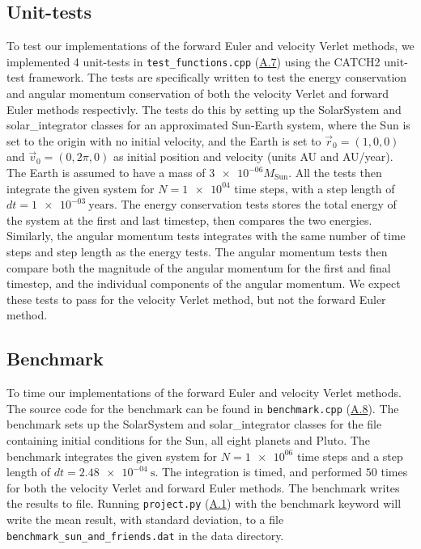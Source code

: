 \documentclass[reprint,english,notitlepage]{revtex4-1}  %
\begin{document}
\subsection{Unit-tests} \label{sec:III:d}
To test our implementations of the forward Euler and velocity Verlet methods, we implemented 4 unit-tests in \verb+test_functions.cpp+ (\hyperref[A.7]{A.7}) using the CATCH2 unit-test framework. The tests are specifically written to test the energy conservation and angular momentum conservation of both the velocity Verlet and forward Euler methods respectivly. The tests do this by setting up the SolarSystem and solar\_integrator classes for an approximated Sun-Earth system, where the Sun is set to the origin with no initial velocity, and the Earth is set to \(\vec{r}_{0} = (1, 0, 0)\) and \(\vec{v}_{0} = (0, 2\pi, 0)\) as initial position and velocity (units AU and AU/year). The Earth is assumed to have a mass of \(\num{3e-06}M_\text{Sun}\). All the tests then integrate the given system for \(N=\num{1e+04}\) time steps, with a step length of \(dt = \SI{1e-03}{\text{years}}\). The energy conservation tests stores the total energy of the system at the first and last timestep, then compares the two energies. Similarly, the angular momentum tests integrates with the same number of time steps and step length as the energy tests. The angular momentum tests then compare both the magnitude of the angular momentum for the first and final timestep, and the individual components of the angular momentum. We expect these tests to pass for the velocity Verlet method, but not the forward Euler method.

\subsection{Benchmark} \label{sec:III:e}
To time our implementations of the forward Euler and velocity Verlet methods. The source code for the benchmark can be found in \verb+benchmark.cpp+ (\hyperref[A.8]{A.8}). The benchmark sets up the SolarSystem and solar\_integrator classes for the file containing initial conditions for the Sun, all eight planets and Pluto. The benchmark integrates the given system for \(N = \num{1e+06}\) time steps and a step length of \(dt = \SI{2.48e-04}{\second}\). The integration is timed, and performed \(50\) times for both the velocity Verlet and forward Euler methods. The benchmark writes the results to file. Running \verb+project.py+ (\hyperref[A.1]{A.1}) with the benchmark keyword will write the mean result, with standard deviation, to a file \verb+benchmark_sun_and_friends.dat+ in the data directory.
\end{document}
